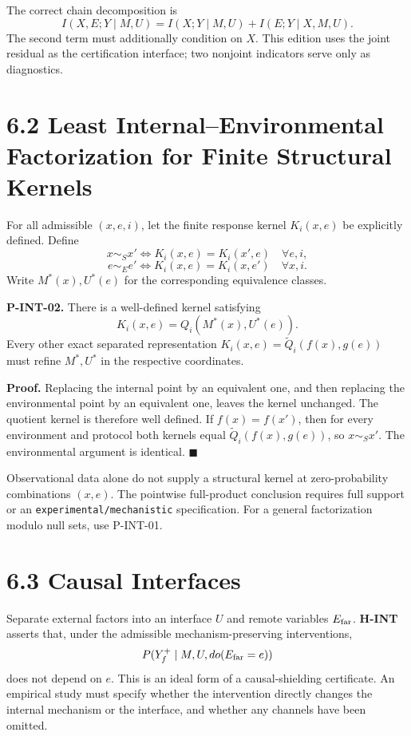 \documentclass[
  english,
  11pt,
  oneside]{book}
\begin{document}
The correct chain decomposition is \[I(X,E;Y\mid M,U)
=I(X;Y\mid M,U)+I(E;Y\mid X,M,U).\] The second term must additionally condition on \(X\). This edition uses the joint residual as the certification interface; two nonjoint indicators serve only as diagnostics.

\section{6.2 Least Internal--Environmental Factorization for Finite Structural Kernels}\label{least-internalenvironmental-factorization-for-finite-structural-kernels}

For all admissible \((x,e,i)\), let the finite response kernel \(K_i(x,e)\) be explicitly defined. Define \[x\sim_Sx'\iff K_i(x,e)=K_i(x',e)\quad\forall e,i,\] \[e\sim_Ee'\iff K_i(x,e)=K_i(x,e')\quad\forall x,i.\] Write \(M^*(x),U^*(e)\) for the corresponding equivalence classes.

\hypertarget{p-int-02}{}\label{p-int-02}

\textbf{P-INT-02.} There is a well-defined kernel satisfying \[K_i(x,e)=Q_i(M^*(x),U^*(e)).\] Every other exact separated representation \(K_i(x,e)=\widetilde Q_i(f(x),g(e))\) must refine \(M^*,U^*\) in the respective coordinates.

\textbf{Proof.} Replacing the internal point by an equivalent one, and then replacing the environmental point by an equivalent one, leaves the kernel unchanged. The quotient kernel is therefore well defined. If \(f(x)=f(x')\), then for every environment and protocol both kernels equal \(\widetilde Q_i(f(x),g(e))\), so \(x\sim_Sx'\). The environmental argument is identical. \(\blacksquare\)

Observational data alone do not supply a structural kernel at zero-probability combinations \((x,e)\). The pointwise full-product conclusion requires full support or an \nolinkurl{experimental/mechanistic} specification. For a general factorization modulo null sets, use P-INT-01.

\section{6.3 Causal Interfaces}\label{causal-interfaces}

Separate external factors into an interface \(U\) and remote variables \(E_{\rm far}\). \textbf{H-INT} asserts that, under the admissible mechanism-preserving interventions, \[P(Y_f^+\mid M,U,do(E_{\rm far}=e))\] does not depend on \(e\). This is an ideal form of a causal-shielding certificate. An empirical study must specify whether the intervention directly changes the internal mechanism or the interface, and whether any channels have been omitted.
\end{document}
